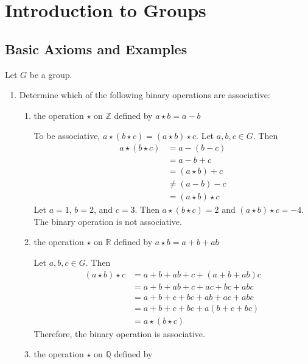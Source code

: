 \chapter{Introduction to Groups}

\section{Basic Axioms and Examples}
Let \(G\) be a group.
\begin{enumerate}
\item
  Determine which of the following binary operations are associative:
  \begin{enumerate}[label = (\alph*)]
  \item
    the operation \(\star\) on \(\mathbb{Z}\) defined by
    \(a\star b = a - b\)
    \par\smallskip
    To be associative, \(a\star (b\star c) = (a\star b)\star c\).
    Let \(a, b, c\in G\).
    Then
    \begin{align*}
      a\star (b\star c) & = a - (b - c)\\
                              & = a - b + c\\
                              & = (a\star b) + c\\
                              & \neq (a - b) - c\\
                              & = (a\star b)\star c
    \end{align*}
    Let \(a = 1\), \(b = 2\), and \(c = 3\).
    Then \(a\star (b\star c) = 2\) and \((a\star b)\star c = -4\).
    The binary operation is not associative.
  \item
    the operation \(\star\) on \(\mathbb{R}\) defined by
    \(a\star b = a + b + ab\)
    \par\smallskip
    Let \(a, b, c\in G\).
    Then
    \begin{align*}
      (a\star b)\star c & = a + b + ab + c + (a + b + ab)c\\
                        & = a + b + ab + c + ac + bc + abc\\
                        & = a + b + c + bc + ab + ac + abc\\
                        & = a + b + c + bc + a(b + c + bc)\\
                        & = a\star (b\star c)
    \end{align*}
    Therefore, the binary operation is associative.
  \item
    the operation \(\star\) on \(\mathbb{Q}\) defined by

\end{enumerate}
\end{enumerate}
